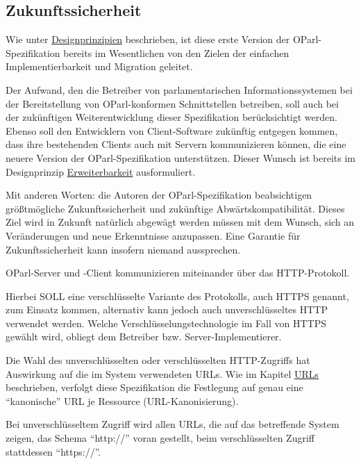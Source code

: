 \documentclass[,a4paper]{article}
\begin{document}
\subsection{Zukunftssicherheit}\label{zukunftssicherheit}

Wie unter \hyperref[designprinzipien]{Designprinzipien} beschrieben, ist
diese erste Version der OParl-Spezifikation bereits im Wesentlichen von
den Zielen der einfachen Implementierbarkeit und Migration geleitet.

Der Aufwand, den die Betreiber von parlamentarischen
Informationssystemen bei der Bereitstellung von OParl-konformen
Schnittstellen betreiben, soll auch bei der zukünftigen
Weiterentwicklung dieser Spezifikation berücksichtigt werden. Ebenso
soll den Entwicklern von Client-Software zukünftig entgegen kommen, dass
ihre bestehenden Clients auch mit Servern kommunizieren können, die eine
neuere Version der OParl-Spezifikation unterstützen. Dieser Wunsch ist
bereits im Designprinzip \hyperref[erweiterbarkeit]{Erweiterbarkeit}
ausformuliert.

Mit anderen Worten: die Autoren der OParl-Spezifikation beabsichtigen
größtmögliche Zukunftssicherheit und zukünftige Abwärtskompatibilität.
Dieses Ziel wird in Zukunft natürlich abgewägt werden müssen mit dem
Wunsch, sich an Veränderungen und neue Erkenntnisse anzupassen. Eine
Garantie für Zukunftssicherheit kann insofern niemand aussprechen.


OParl-Server und -Client kommunizieren miteinander über das
HTTP-Protokoll.

Hierbei SOLL eine verschlüsselte Variante des Protokolls, auch HTTPS
genannt, zum Einsatz kommen, alternativ kann jedoch auch
unverschlüsseltes HTTP verwendet werden. Welche
Verschlüsselungstechnologie im Fall von HTTPS gewählt wird, obliegt dem
Betreiber bzw. Server-Implementierer.

Die Wahl des unverschlüsselten oder verschlüsselten HTTP-Zugriffs hat
Auswirkung auf die im System verwendeten URLs. Wie im Kapitel
\hyperref[urls]{URLs} beschrieben, verfolgt diese Spezifikation die
Festlegung auf genau eine ``kanonische'' URL je Ressource
(URL-Kanonisierung).

Bei unverschlüsseltem Zugriff wird allen URLs, die auf das betreffende
System zeigen, das Schema ``http://'' voran gestellt, beim
verschlüsselten Zugriff stattdessen ``https://''.
\end{document}
